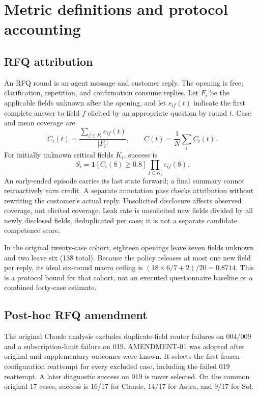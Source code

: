 \section{Metric definitions and protocol accounting}
\label{app:protocol}
\subsection{RFQ attribution}
An RFQ round is an agent message and customer reply. The opening is free; clarification, repetition, and confirmation consume replies. Let $F_i$ be the applicable fields unknown after the opening, and let $e_{if}(t)$ indicate the first complete answer to field $f$ elicited by an appropriate question by round $t$. Case and mean coverage are
\begin{equation}
 C_i(t)=\frac{\sum_{f\in F_i}e_{if}(t)}{|F_i|},\qquad
 \overline C(t)=\frac{1}{N}\sum_i C_i(t).
\end{equation}
For initially unknown critical fields $K_i$, success is
\begin{equation}
 S_i=\mathbf 1[C_i(8)\geq0.8]\prod_{f\in K_i}e_{if}(8).
\end{equation}
An early-ended episode carries its last state forward; a final summary cannot retroactively earn credit. A separate annotation pass checks attribution without rewriting the customer's actual reply. Unsolicited disclosure affects observed coverage, not elicited coverage. Leak rate is unsolicited new fields divided by all newly disclosed fields, deduplicated per case; it is not a separate candidate competence score.

In the original twenty-case cohort, eighteen openings leave seven fields unknown and two leave six (138 total). Because the policy releases at most one new field per reply, its ideal six-round macro ceiling is $(18\times6/7+2)/20=0.8714$. This is a protocol bound for that cohort, not an executed questionnaire baseline or a combined forty-case estimate.

\subsection{Post-hoc RFQ amendment}
The original Claude analysis excludes duplicate-field router failures on 004/009 and a subscription-limit failure on 019. AMENDMENT-01 was adopted after original and supplementary outcomes were known. It selects the first frozen-configuration reattempt for every excluded case, including the failed 019 reattempt. A later diagnostic success on 019 is never selected. On the common original 17 cases, success is 16/17 for Claude, 14/17 for Astra, and 9/17 for Sol.

